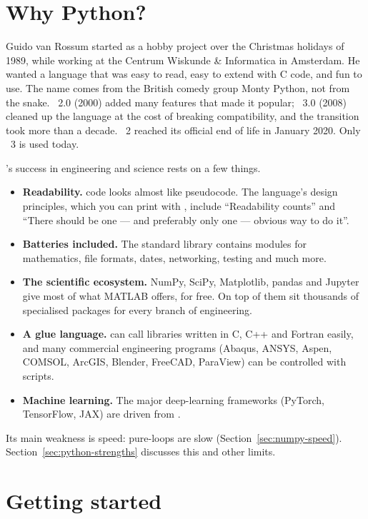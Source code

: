 \section{Why Python?}

\begin{history}
Guido van Rossum started \py as a hobby project over the Christmas holidays of 1989,
while working at the Centrum Wiskunde \& Informatica in Amsterdam. He wanted a language
that was easy to read, easy to extend with C code, and fun to use. The name comes from the
British comedy group Monty Python, not from the snake. \py~2.0 (2000) added many features
that made it popular; \py~3.0 (2008) cleaned up the language at the cost of breaking
compatibility, and the transition took more than a decade. \py~2 reached its official
end of life in January 2020. Only \py~3 is used today.
\end{history}

\py's success in engineering and science rests on a few things.
\begin{itemize}
\item \textbf{Readability.} \py code looks almost like pseudocode. The language's design
  principles, which you can print with , include ``Readability
  counts'' and ``There should be one --- and preferably only one --- obvious way to do
  it''.
\item \textbf{Batteries included.} The standard library contains modules for mathematics,
  file formats, dates, networking, testing and much more.
\item \textbf{The scientific ecosystem.} NumPy, SciPy, Matplotlib, pandas and Jupyter give
  \py most of what MATLAB offers, for free. On top of them sit thousands of specialised
  packages for every branch of engineering.
\item \textbf{A glue language.} \py can call libraries written in C, C++ and Fortran
  easily, and many commercial engineering programs (Abaqus, ANSYS, Aspen, COMSOL, ArcGIS,
  Blender, FreeCAD, ParaView) can be controlled with \py scripts.
\item \textbf{Machine learning.} The major deep-learning frameworks (PyTorch, TensorFlow,
  JAX) are driven from \py.
\end{itemize}
Its main weakness is speed: pure-\py loops are slow (Section~\ref{sec:numpy-speed}).
Section~\ref{sec:python-strengths} discusses this and other limits.

\section{Getting started}

